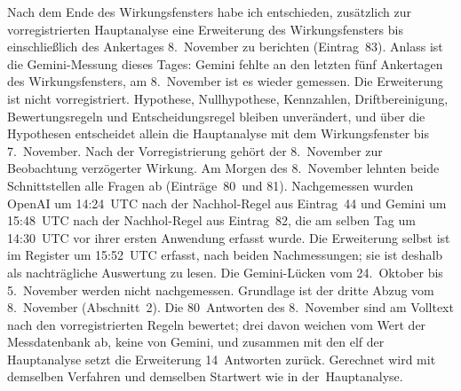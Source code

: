 \documentclass[11pt]{article}
\begin{document}
Nach dem Ende des Wirkungsfensters habe ich entschieden, zusätzlich zur vorregistrierten Hauptanalyse eine Erweiterung des Wirkungsfensters bis einschließlich des Ankertages 8.~November zu berichten (Eintrag~83). Anlass ist die Gemini-Messung dieses Tages: Gemini fehlte an den letzten fünf Ankertagen des Wirkungsfensters, am 8.~November ist es wieder gemessen. Die Erweiterung ist nicht vorregistriert. Hypothese, Nullhypothese, Kennzahlen, Driftbereinigung, Bewertungsregeln und Entscheidungsregel bleiben unverändert, und über die Hypothesen entscheidet allein die Hauptanalyse mit dem Wirkungsfenster bis 7.~November. Nach der Vorregistrierung gehört der 8.~November zur Beobachtung verzögerter Wirkung. Am Morgen des 8.~November lehnten beide Schnittstellen alle Fragen ab (Einträge~80~und 81). Nachgemessen wurden OpenAI um 14:24~UTC nach der Nachhol-Regel aus Eintrag~44 und Gemini um 15:48~UTC nach der Nachhol-Regel aus Eintrag~82, die am selben Tag um 14:30~UTC vor ihrer ersten Anwendung erfasst wurde. Die Erweiterung selbst ist im Register um 15:52~UTC erfasst, nach beiden Nachmessungen; sie ist deshalb als nachträgliche Auswertung zu lesen. Die Gemini-Lücken vom 24.~Oktober bis 5.~November werden nicht nachgemessen. Grundlage ist der dritte Abzug vom 8.~November (Abschnitt~2). Die 80~Antworten des 8.~November sind am Volltext nach den vorregistrierten Regeln bewertet; drei davon weichen vom Wert der Messdatenbank ab, keine von Gemini, und zusammen mit den elf der Hauptanalyse setzt die Erweiterung 14~Antworten zurück. Gerechnet wird mit demselben Verfahren und demselben Startwert wie in der~\mbox{Hauptanalyse.}
\end{document}
